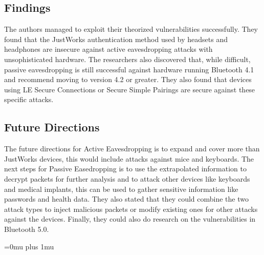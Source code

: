 \documentclass[a4paper,12pt]{article}
\begin{document}
\subsection{Findings}

\noindent
The authors managed to exploit their theorized vulnerabilities successfully.  They found that the JustWorks authentication method used by headsets and headphones are insecure against active eavesdropping attacks with unsophisticated hardware.  The researchers also discovered that, while difficult, passive eavesdropping is still successful against hardware running Bluetooth 4.1 and recommend moving to version 4.2 or greater.  They also found that devices using LE Secure Connections or Secure Simple Pairings are secure against these specific attacks.

\subsection{Future Directions}

\noindent
The future directions for Active Eavesdropping is to expand and cover more than JustWorks devices, this would include attacks against mice and keyboards.  The next steps for Passive Easedropping is to use the extrapolated information to decrypt packets for further analysis and to attack other devices like keyboards and medical implants, this can be used to gather sensitive information like passwords and health data.  They also stated that they could combine the two attack types to inject malicious packets or modify existing ones for other attacks against the devices.  Finally, they could also do research on the vulnerabilities in Bluetooth 5.0.

\Urlmuskip=0mu plus 1mu\relax

\end{document}
